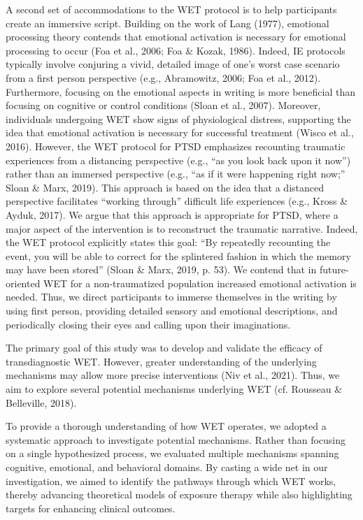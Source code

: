 \documentclass[
  man,floatsintext]{apa7}
\begin{document}
A second set of accommodations to the WET protocol is to help participants create an immersive script.
Building on the work of Lang (1977), emotional processing theory contends that
emotional activation is necessary for emotional processing to occur (Foa et al., 2006; Foa \& Kozak, 1986).
Indeed, IE protocols typically involve conjuring a vivid, detailed image of one's worst case scenario from a first person perspective (e.g., Abramowitz, 2006; Foa et al., 2012).
Furthermore, focusing on the emotional aspects in writing is more beneficial than focusing on cognitive or control conditions (Sloan et al., 2007).
Moreover, individuals undergoing WET show signs of physiological distress, supporting the idea that emotional activation is necessary for successful treatment (Wisco et al., 2016).
However, the WET protocol for PTSD emphasizes recounting traumatic experiences from a distancing perspective (e.g., ``as you look back upon it now'') rather than an immersed perspective (e.g., ``as if it were happening right now;'' Sloan \& Marx, 2019).
This approach is based on the idea that a distanced perspective facilitates ``working through'' difficult life experiences (e.g., Kross \& Ayduk, 2017).
We argue that this approach is appropriate for PTSD, where a major aspect of the intervention is to reconstruct the traumatic narrative.
Indeed, the WET protocol explicitly states this goal: ``By repeatedly recounting the event, you will be able to correct for the splintered fashion in which the memory may have been stored'' (Sloan \& Marx, 2019, p. 53).
We contend that in future-oriented WET for a non-traumatized population increased emotional activation is needed.
Thus, we direct participants to immerse themselves in the writing by using first person, providing detailed sensory and emotional descriptions, and periodically closing their eyes and calling upon their imaginations.

The primary goal of this study was to develop and validate the efficacy of transdiagnostic WET.
However, greater understanding of the underlying mechanisms may allow more precise interventions (Niv et al., 2021).
Thus, we aim to explore several potential mechanisms underlying WET (cf. Rousseau \& Belleville, 2018).

To provide a thorough understanding of how WET operates, we adopted a systematic approach to investigate potential mechanisms.
Rather than focusing on a single hypothesized process, we evaluated multiple mechanisms spanning cognitive, emotional, and behavioral domains.
By casting a wide net in our investigation, we aimed to identify the pathways through which WET works, thereby advancing theoretical models of exposure therapy while also highlighting targets for enhancing clinical outcomes.
\end{document}
